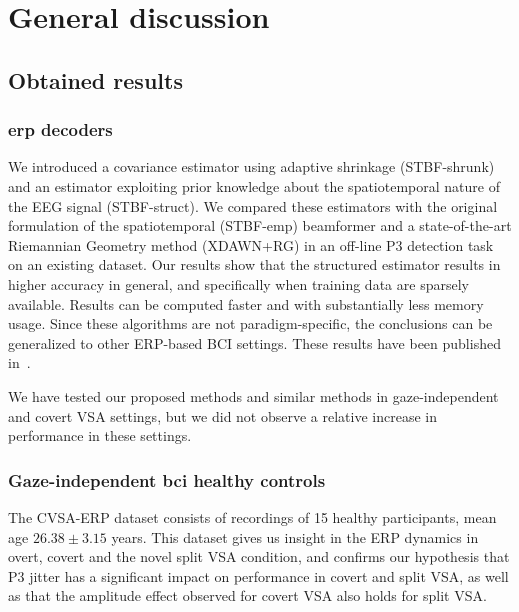 
\section{General discussion}

\subsection{Obtained results}

\subsubsection{\ac{erp} decoders}
We introduced a covariance estimator using adaptive shrinkage (STBF-shrunk) and an estimator
exploiting prior knowledge about the spatiotemporal nature of the EEG signal
(STBF-struct).
We compared these estimators with the original formulation of the
spatiotemporal (STBF-emp)
beamformer and a state-of-the-art Riemannian Geometry method (XDAWN+RG) in an off-line P3 detection task on
an existing dataset.
Our results show that the structured estimator results in higher accuracy in
general, and specifically when training data are sparsely available.
Results can be computed faster and with
substantially less memory usage.
Since these algorithms are not paradigm-specific, the conclusions can be
generalized to other ERP-based BCI settings.
These results have been published in~\cite{VanDenKerchove2022}.

We have tested our proposed methods and similar methods in gaze-independent and
covert VSA settings, but we did not observe a relative increase in performance
in these settings.



\subsubsection{Gaze-independent \ac{bci} healthy controls}
The CVSA-ERP dataset consists of recordings of 15 healthy participants, mean age
$26.38\pm3.15$ years.
This dataset gives us insight in the ERP dynamics in overt, covert and the
novel split VSA condition, and confirms our hypothesis that P3 jitter has a
significant impact on performance in covert and split VSA, as well as that the
amplitude effect observed for covert VSA also holds for split VSA.

